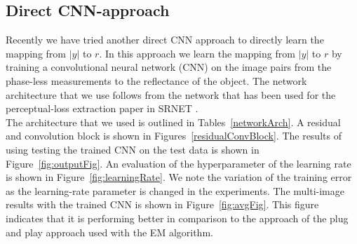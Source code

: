 \documentclass[a4paper, 11pt]{article}
\begin{document}
\subsection{Direct CNN-approach}
Recently we have tried another direct CNN approach to directly learn the mapping from $|y|$ to $r$. In this approach we learn the mapping from $|y|$ to $r$ by training a convolutional neural network (CNN) on the image pairs from the phase-less measurements to the reflectance of the object. The network architecture that we use follows from the network that has been used for the perceptual-loss extraction paper in SRNET \cite{SRNET}. \\
The architecture that we used is outlined in Tables~\ref{networkArch}. A residual and convolution block is shown in Figures~\ref{residualConvBlock}. The results of using testing the trained CNN on the test data is shown in Figure~\ref{fig:outputFig}. An evaluation of the hyperparameter of the learning rate is shown in Figure~\ref{fig:learningRate}. We note the variation of the training error as the learning-rate parameter is changed in the experiments. The multi-image results with the trained CNN is shown in Figure~\ref{fig:avgFig}. This figure indicates that it is performing better in comparison to the approach of the plug and play approach used with the EM algorithm. 
\end{document}
